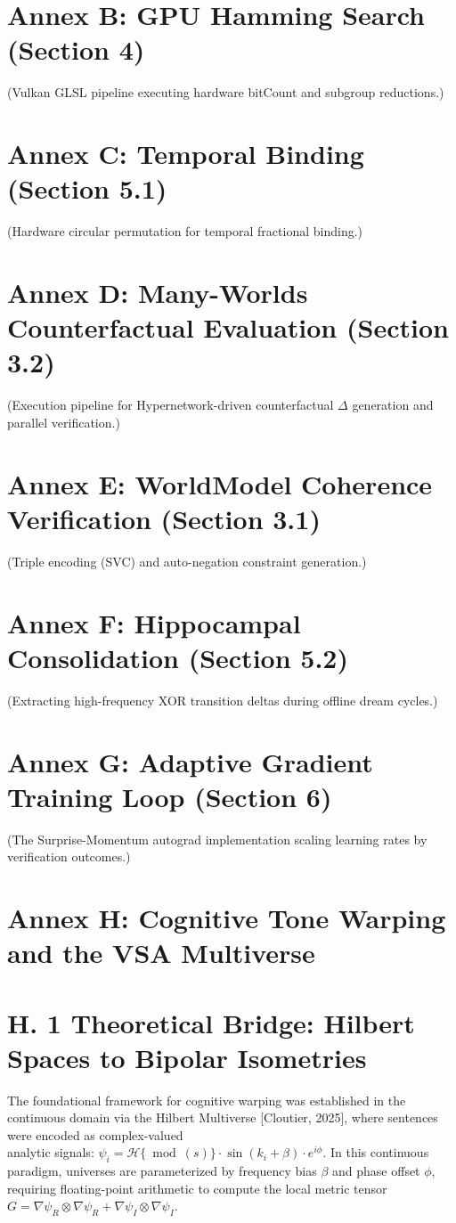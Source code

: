 \documentclass[10pt]{article}
\begin{document}
\section*{Annex B: GPU Hamming Search (Section 4)}
(Vulkan GLSL pipeline executing hardware bitCount and subgroup reductions.)

\section*{Annex C: Temporal Binding (Section 5.1)}
(Hardware circular permutation for temporal fractional binding.)

\section*{Annex D: Many-Worlds Counterfactual Evaluation (Section 3.2)}
(Execution pipeline for Hypernetwork-driven counterfactual $\Delta$ generation and parallel verification.)

\section*{Annex E: WorldModel Coherence Verification (Section 3.1)}
(Triple encoding (SVC) and auto-negation constraint generation.)

\section*{Annex F: Hippocampal Consolidation (Section 5.2)}
(Extracting high-frequency XOR transition deltas during offline dream cycles.)

\section*{Annex G: Adaptive Gradient Training Loop (Section 6)}
(The Surprise-Momentum autograd implementation scaling learning rates by verification outcomes.)

\section*{Annex H: Cognitive Tone Warping and the VSA Multiverse}
\section*{H. 1 Theoretical Bridge: Hilbert Spaces to Bipolar Isometries}
The foundational framework for cognitive warping was established in the continuous domain via the Hilbert Multiverse [Cloutier, 2025], where sentences were encoded as complex-valued\\
analytic signals: $\psi_{i}=\mathcal{H}\{\bmod (s)\} \cdot \sin \left(k_{i}+\beta\right) \cdot e^{i \phi}$. In this continuous paradigm, universes are parameterized by frequency bias $\beta$ and phase offset $\phi$, requiring floating-point arithmetic to compute the local metric tensor $G=\nabla \psi_{R} \otimes \nabla \psi_{R}+\nabla \psi_{I} \otimes \nabla \psi_{I}$.
\end{document}
